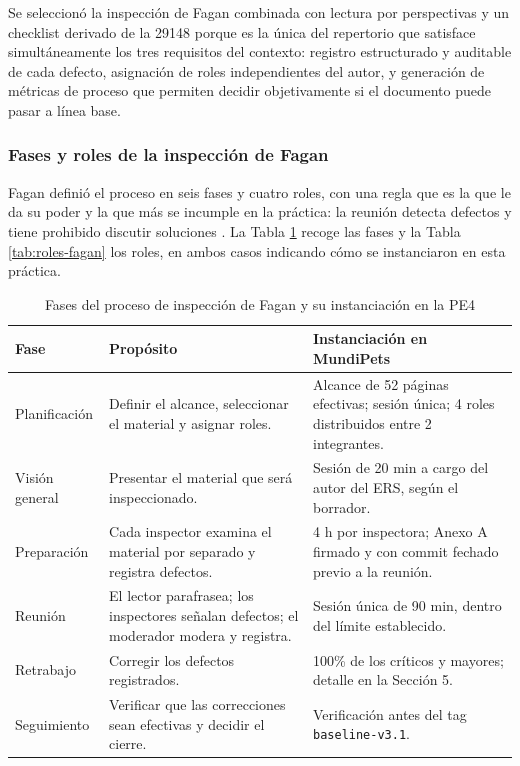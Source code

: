 \documentclass[journal,onecolumn]{IEEEtran}
\begin{document}
	Se seleccionó la inspección de Fagan combinada con lectura por perspectivas y un checklist derivado de la 29148 porque es la única del repertorio que satisface simultáneamente los tres requisitos del contexto: registro estructurado y auditable de cada defecto, asignación de roles independientes del autor, y generación de métricas de proceso que permiten decidir objetivamente si el documento puede pasar a línea base.
	
	\subsubsection{Fases y roles de la inspección de Fagan}
	
	Fagan definió el proceso en seis fases y cuatro roles, con una regla que es la que le da su poder y la que más se incumple en la práctica: la reunión detecta defectos y tiene prohibido discutir soluciones \cite{fagan}. La Tabla \ref{tab:fases-fagan} recoge las fases y la Tabla \ref{tab:roles-fagan} los roles, en ambos casos indicando cómo se instanciaron en esta práctica.
	
	\begin{table}[h]
		\centering
		\caption{Fases del proceso de inspección de Fagan \cite{fagan} y su instanciación en la PE4}
		\label{tab:fases-fagan}
		\begin{tabular}{p{2.2cm}p{4.3cm}p{6cm}}
			\toprule
			\textbf{Fase} & \textbf{Propósito} & \textbf{Instanciación en MundiPets} \\
			\midrule
			Planificación & Definir el alcance, seleccionar el material y asignar roles. & Alcance de 52 páginas efectivas; sesión única; 4 roles distribuidos entre 2 integrantes. \\
			Visión general & Presentar el material que será inspeccionado. & Sesión de 20 min a cargo del autor del ERS, según el borrador. \\
			Preparación & Cada inspector examina el material por separado y registra defectos. & 4 h por inspectora; Anexo A firmado y con commit fechado previo a la reunión. \\
			Reunión & El lector parafrasea; los inspectores señalan defectos; el moderador modera y registra. & Sesión única de 90 min, dentro del límite establecido. \\
			Retrabajo & Corregir los defectos registrados. & 100\% de los críticos y mayores; detalle en la Sección 5. \\
			Seguimiento & Verificar que las correcciones sean efectivas y decidir el cierre. & Verificación antes del tag \texttt{baseline-v3.1}. \\
			\bottomrule
		\end{tabular}
	\end{table}
	
\end{document}
